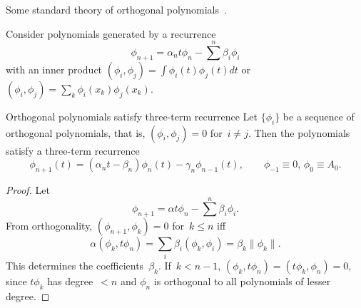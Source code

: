 Some standard theory of orthogonal polynomials~\cite{DahlBjor:nummethods}.

Consider polynomials generated by a recurrence
\begin{equation} \phi_{n+1}=\alpha_n t\phi_n -\sum^n\beta_i\phi_i
    \label{eq:poly-family}\end{equation}
with an inner product
$(\phi_i,\phi_j)=\int\phi_i(t)\phi_j(t)dt$ or
$(\phi_i,\phi_j)=\sum_k\phi_i(x_k)\phi_j(x_k)$.

\begin{llemma}{Orthogonal polynomials satisfy three-term recurrence}
Let $\{\phi_i\}$ be a sequence of orthogonal polynomials, that is,
$(\phi_i,\phi_j)=0$ for~$i\not=j$. Then the polynomials satisfy a
three-term recurrence
\begin{equation} \phi_{n+1}(t)=
      (\alpha_nt-\beta_n)\phi_n(t)
      -\gamma_n\phi_{n-1}(t),\qquad \phi_{-1}\equiv0,\,\phi_0\equiv A_0.
    \label{eq:poly-3t}\end{equation}
\end{llemma}
\begin{proof}
Let \[ \phi_{n+1}=\alpha t\phi_n -\sum^n\beta_i\phi_i. \]
From orthogonality, $(\phi_{n+1},\phi_k)=0$ for~$k\leq n$ iff
\[ \alpha (\phi_k,t\phi_n)=\sum_i\beta_i(\phi_k,\phi_i)
         =\beta_k\|\phi_k\|. \]
This determines the coefficients~$\beta_k$.
If~$k<n-1$, $(\phi_k,t\phi_n)=(t\phi_k,\phi_n)=0$, since $t\phi_k$ has
degree~$<n$ and $\phi_n$ is orthogonal to all polynomials of lesser
degree.
\end{proof}
